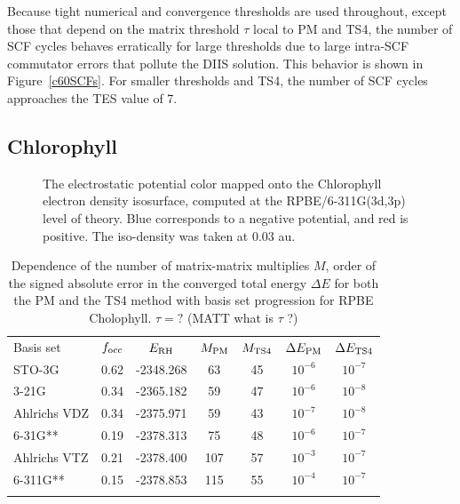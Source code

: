 \commentoutA{\documentclass[prb,aps,twocolumn,twocolumngrid,secnumarabic,superbib,hyperref]{revtex4}}
\begin{document}
{Because tight numerical and convergence thresholds are used throughout, 
except those that depend on the matrix threshold $\tau$ local to {\sc PM} and {\sc TS4},
the number of SCF cycles behaves erratically for large thresholds due to large intra-SCF 
commutator errors that pollute the DIIS solution.  This behavior is shown in 
Figure~\ref{c60SCFs}. For smaller thresholds and TS4, the number of SCF cycles 
approaches the TES value of 7.  

\subsection{Chlorophyll}

\begin{figure}[h]
\caption{The electrostatic potential color mapped onto the Chlorophyll electron density isosurface,
         computed at the RPBE/6-311G(3d,3p) level of theory.  Blue corresponds to a negative potential, 
         and red is positive.  The iso-density was taken at 0.03 au.}\label{ChPic}
\end{figure}

\begin{table}
\caption{Dependence of the number of matrix-matrix multiplies $M$, order of the signed absolute 
error in the converged total energy $\Delta E$ for both the PM and the TS4 method with basis set 
progression for RPBE Cholophyll. $\tau = ?$ (MATT what is $\tau$ ?)}
\label{ChlorophyllConvergence}
\squeezetable
\begin{tabular}{lcccccc}
\toprule
Basis set       &  $f_{\rm occ}$ & $E_{\rm RH}$       &$M_{\rm PM}$&$M_{\rm TS4}$& $\Delta E_{\rm PM}$ & $\Delta E_{\rm TS4}$ \\
\colrule
STO-3G          &  0.62      & -2348.268  & 63      & 45       & $ 10^{-6}$   &  $ 10^{-7}$   \\ 
3-21G           &  0.34	     & -2365.182  & 59      & 47       & $ 10^{-6}$   &  $ 10^{-8}$   \\
Ahlrichs VDZ    &  0.34      & -2375.971  & 59      & 43       & $ 10^{-7}$   &  $ 10^{-8}$   \\
6-31G**         &  0.19      & -2378.313  & 75      & 48       & $ 10^{-6}$   &  $ 10^{-7}$   \\
Ahlrichs VTZ    &  0.21      & -2378.400  & 107     & 57       & $ 10^{-3}$   &  $ 10^{-7}$   \\
6-311G**        &  0.15      & -2378.853  & 115     & 55       & $ 10^{-4}$   &  $ 10^{-7}$   \\
\botrule
\end{tabular}
\end{table}

}
\end{document}
